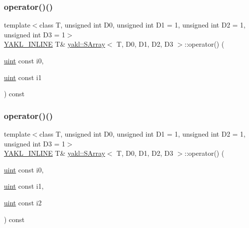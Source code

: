 \subsubsection{\texorpdfstring{operator()()}{operator()()}\hspace{0.1cm}{\footnotesize\ttfamily [2/4]}}
{\footnotesize\ttfamily template$<$class T, unsigned int D0, unsigned int D1 = 1, unsigned int D2 = 1, unsigned int D3 = 1$>$ \\
\hyperlink{YAKL_8h_aa0dd629ffce6d564b19e9313fb91a5ad}{Y\+A\+K\+L\+\_\+\+I\+N\+L\+I\+NE} T\& \hyperlink{classyakl_1_1SArray}{yakl\+::\+S\+Array}$<$ T, D0, D1, D2, D3 $>$\+::operator() (\begin{DoxyParamCaption}\item[{\hyperlink{classyakl_1_1SArray_a777ad93441c16e786309b27e40bc56f0}{uint} const}]{i0,  }\item[{\hyperlink{classyakl_1_1SArray_a777ad93441c16e786309b27e40bc56f0}{uint} const}]{i1 }\end{DoxyParamCaption}) const\hspace{0.3cm}{\ttfamily [inline]}}

\mbox{\label{classyakl_1_1SArray_a0c45c587a44fd0bf390a8e2c809fce36}} 
\subsubsection{\texorpdfstring{operator()()}{operator()()}\hspace{0.1cm}{\footnotesize\ttfamily [3/4]}}
{\footnotesize\ttfamily template$<$class T, unsigned int D0, unsigned int D1 = 1, unsigned int D2 = 1, unsigned int D3 = 1$>$ \\
\hyperlink{YAKL_8h_aa0dd629ffce6d564b19e9313fb91a5ad}{Y\+A\+K\+L\+\_\+\+I\+N\+L\+I\+NE} T\& \hyperlink{classyakl_1_1SArray}{yakl\+::\+S\+Array}$<$ T, D0, D1, D2, D3 $>$\+::operator() (\begin{DoxyParamCaption}\item[{\hyperlink{classyakl_1_1SArray_a777ad93441c16e786309b27e40bc56f0}{uint} const}]{i0,  }\item[{\hyperlink{classyakl_1_1SArray_a777ad93441c16e786309b27e40bc56f0}{uint} const}]{i1,  }\item[{\hyperlink{classyakl_1_1SArray_a777ad93441c16e786309b27e40bc56f0}{uint} const}]{i2 }\end{DoxyParamCaption}) const\hspace{0.3cm}{\ttfamily [inline]}}

